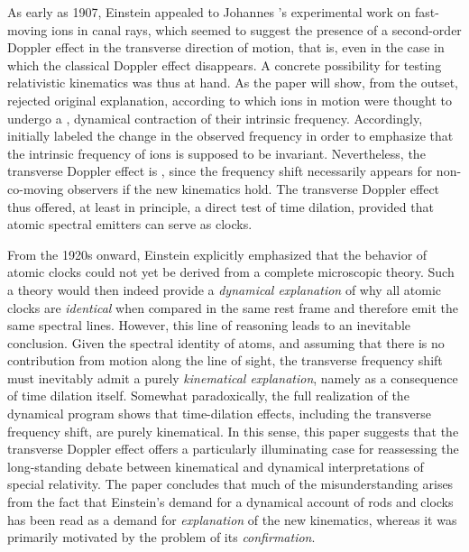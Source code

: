 \documentclass[submitted,12pt]{article}
\newcommand{\tDe}{transverse Doppler effect\xspace}
\begin{document}
As early as 1907, Einstein appealed to Johannes \citet{Stark1906}’s experimental work on fast-moving ions in canal rays, which seemed to suggest the presence of a second-order Doppler effect in the transverse direction of motion, that is, even in the case in which the classical Doppler effect disappears. A concrete possibility for testing relativistic kinematics was thus at hand. As the paper will show, from the outset, \citet{Einstein1907d} rejected  original explanation, according to which ions in motion were thought to undergo a , dynamical contraction of their intrinsic frequency. Accordingly, \textcites[422]{Einstein1908}[133]{Einstein1910} initially labeled the change in the observed frequency  in order to emphasize that the intrinsic frequency of ions is supposed to be invariant. Nevertheless, the \tDe is , since the frequency shift necessarily appears for non-co-moving observers if the new kinematics hold. The transverse Doppler effect thus offered, at least in principle, a direct test of time dilation, provided that atomic spectral emitters can serve as  clocks. 

From the 1920s onward, Einstein explicitly emphasized that the behavior of atomic clocks could not yet be derived from a complete microscopic theory. Such a theory would then indeed provide a \emph{dynamical explanation} of why all atomic clocks are \emph{identical} when compared in the same rest frame and therefore emit the same spectral lines. However, this line of reasoning leads to an inevitable conclusion. Given the spectral identity of atoms, and assuming that there is no contribution from motion along the line of sight, the transverse frequency shift must inevitably admit a purely \emph{kinematical explanation}, namely as a consequence of time dilation itself. Somewhat paradoxically, the full realization of the dynamical program shows that time-dilation effects, including the transverse frequency shift, are purely kinematical. In this sense, this paper suggests that the \tDe offers a particularly illuminating case for reassessing the long-standing debate between kinematical and dynamical interpretations of special relativity.  The paper concludes that much of the misunderstanding arises from the fact that Einstein’s demand for a dynamical account of rods and clocks has been read as a demand for \emph{explanation} of the new kinematics, whereas it was primarily motivated by the problem of its \emph{confirmation}. 


\printbibliography
\end{document}

